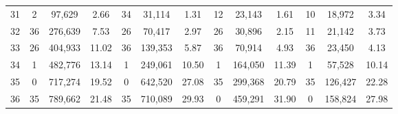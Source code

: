 \begin{table}[H]
{\begin{tabular}{c c c c c c c c c c c c c}
       31 & 2  & 97,629 &  2.66 & 34  & 31,114 &  1.31 & 12  & 23,143 &  1.61 & 10  & 18,972 &  3.34 \\ 
       32 & 36  & 276,639 &  7.53 & 26  & 70,417 &  2.97 & 26  & 30,896 &  2.15 & 11  & 21,142 &  3.73 \\ 
       33 & 26  & 404,933 & 11.02 & 36  & 139,353 &  5.87 & 36  & 70,914 &  4.93 & 36  & 23,450 &  4.13 \\ 
       34 & 1  & 482,776 & 13.14 & 1  & 249,061 & 10.50 & 1  & 164,050 & 11.39 & 1  & 57,528 & 10.14 \\ 
       35 & 0  & 717,274 & 19.52 & 0  & 642,520 & 27.08 & 35  & 299,368 & 20.79 & 35  & 126,427 & 22.28 \\ 
       36 & 35  & 789,662 & 21.48 & 35  & 710,089 & 29.93 & 0  & 459,291 & 31.90 & 0  & 158,824 & 27.98 \\ 
      
        \bottomrule
    \end{tabular}
    }
\end{table}

